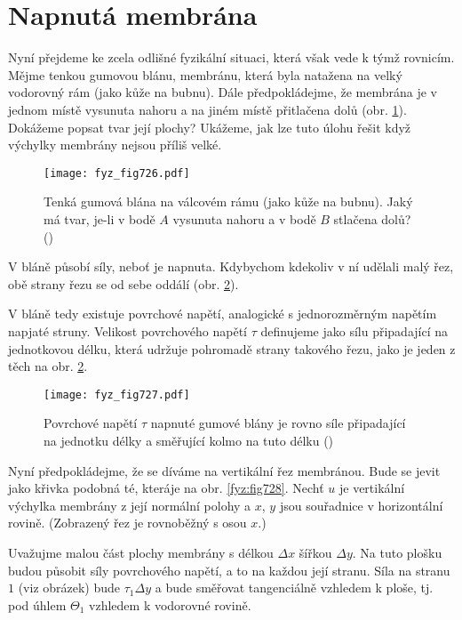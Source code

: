   \section{Napnutá membrána}\label{fyz:IIchapXIIsecIII}
    Nyní přejdeme ke zcela odlišné fyzikální situaci, která však vede k týmž rovnicím. Mějme ten­kou
    gumovou blánu, membránu, která byla natažena na velký vodorovný rám (jako kůže na bub­nu). Dále
    předpokládejme, že membrána je v jednom místě vysunuta nahoru a na jiném místě přitlačena dolů
    (obr. \ref{fyz:fig726}). Dokážeme popsat tvar její plochy? Ukážeme, jak lze tuto úlohu řešit
    když výchylky membrány nejsou příliš velké.

    \begin{figure}[ht!] %
      \centering
      \texttt{[image: fyz\_fig726.pdf]}
      \caption{Tenká gumová blána na válcovém rámu (jako kůže na bubnu). Jaký má tvar, je-li v bodě
        \(A\) vysunuta nahoru a v bodě \(B\) stlačena dolů? (\cite[s.~211]{Feynman02})}
      \label{fyz:fig726}
    \end{figure}

    V bláně působí síly, neboť je napnuta. Kdybychom kdekoliv v ní udělali malý řez, obě strany 
    řezu se od sebe oddálí (obr. \ref{fyz:fig727}).

    V bláně tedy existuje povrchové napětí, analogické s jednorozměrným napětím napjaté struny.
    Velikost povrchového napětí \(\tau\) definujeme jako sílu připadající na jednotkovou délku,
    která udržuje pohromadě strany takového řezu, jako je jeden z těch na obr. \ref{fyz:fig727}.

    \begin{figure}[ht!] %
      \centering
      \texttt{[image: fyz\_fig727.pdf]}
      \caption{Povrchové napětí \(\tau\) napnuté gumové blány je rovno síle připadající na jednotku
        délky a směřující kolmo na tuto délku (\cite[s.~211]{Feynman02})}
      \label{fyz:fig727}
    \end{figure}

    Nyní předpokládejme, že se díváme na vertikální řez membránou. Bude se jevit jako křivka podobná
    té, kteráje na obr. \ref{fyz:fig728}. Nechť \(u\) je vertikální výchylka membrány z její
    normální polohy a \(x\), \(y\) jsou souřadnice v horizontální rovině. (Zobrazený řez je
    rovnoběžný s osou \(x\).)

    Uvažujme malou část plochy membrány s délkou \(\Delta x\) šířkou \(\Delta y\). Na tuto plošku
    budou působit síly povrchového napětí, a to na každou její stranu. Síla na stranu \(1\) (viz
    obrázek) bude \(\tau_1\Delta y\) a bude směřovat tangenciálně vzhledem k ploše, tj. pod úhlem
    \(\Theta_1\) vzhledem k vodorovné rovině.

